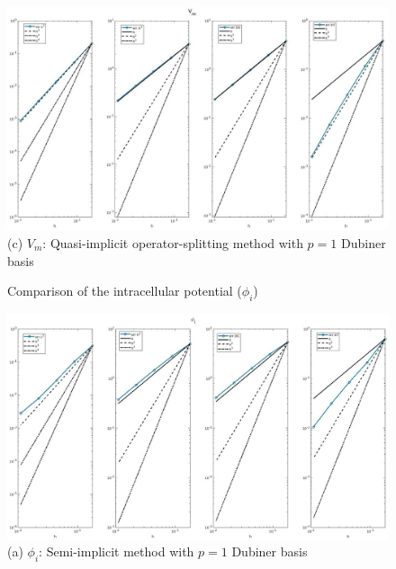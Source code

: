 \documentclass[a4paper,11pt]{article}
\begin{document}
\begin{figure}[h]
\begin{center}
\includegraphics[width =\textwidth]{./D1_Vm_1_OS.jpg}
\caption*{(c) $V_m$: Quasi-implicit operator-splitting method with $p=1$ Dubiner basis}
\end{center}
\end{figure}

\begin{figure}[H]
\caption{Comparison of the intracellular potential ($\phi_i$)}
\label{pi-time}
\begin{center}
\includegraphics[width = \textwidth]{./D1_Phii_1.jpg}
\caption*{(a) $\phi_i$: Semi-implicit method with $p=1$ Dubiner basis}
\end{center}
\end{figure}
\newpage
\end{document}
